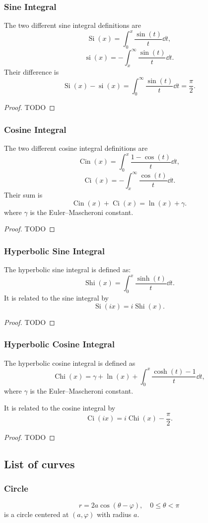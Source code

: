 \documentclass[a4paper,12pt]{report}
\begin{document}
\begin{itemize}
\begin{itemize}
\subsubsection{Sine Integral}
The two different sine integral definitions are
\[\operatorname{Si}(x)=\int_0^x\frac{\sin(t)}{t}\dd{t},\]
\[\operatorname{si}(x)=-\int_x^\infty\frac{\sin(t)}{t}\dd{t}.\]
Their difference is
\[\operatorname{Si}(x)-\operatorname{si}(x)=\int_0^\infty\frac{\sin(t)}{t}\dd{t}=\frac{\pi}{2}.\]
\begin{proof}
TODO
\end{proof}
\subsubsection{Cosine Integral}
The two different cosine integral definitions are
\[\operatorname{Cin}(x)=\int_0^x\frac{1-\cos(t)}{t}\dd{t},\]
\[\operatorname{Ci}(x)=-\int_x^\infty\frac{\cos(t)}{t}\dd{t}.\]
Their sum is
\[\operatorname{Cin}(x)+\operatorname{Ci}(x)=\ln(x)+\gamma.\]
where $\gamma$ is the Euler–Mascheroni constant.
\begin{proof}
TODO
\end{proof}
\subsubsection{Hyperbolic Sine Integral}
The hyperbolic sine integral is defined as:
\[\operatorname{Shi}(x)=\int_0^x\frac{\sinh(t)}{t}\dd{t}.\]
It is related to the sine integral by
\[\operatorname{Si}(ix)=i\operatorname{Shi}(x).\]
\begin{proof}
TODO
\end{proof}
\subsubsection{Hyperbolic Cosine Integral}
The hyperbolic cosine integral is defined as
\[\operatorname{Chi}(x)=\gamma+\ln(x)+\int_0^x\frac{\cosh(t)-1}{t}\dd{t},\]
where $\gamma$ is the Euler–Mascheroni constant.

It is related to the cosine integral by
\[\operatorname{Ci}(ix)=i\operatorname{Chi}(x)-\frac{\pi}{2}.\]
\begin{proof}
TODO
\end{proof}
\subsection{List of curves}
\subsubsection{Circle}
\[r=2a\cos(\theta-\varphi),\quad 0\le\theta<\pi\]
is a circle centered at $(a,\varphi)$ with radius $a$.

\end{itemize}
\end{itemize}
\end{document}
